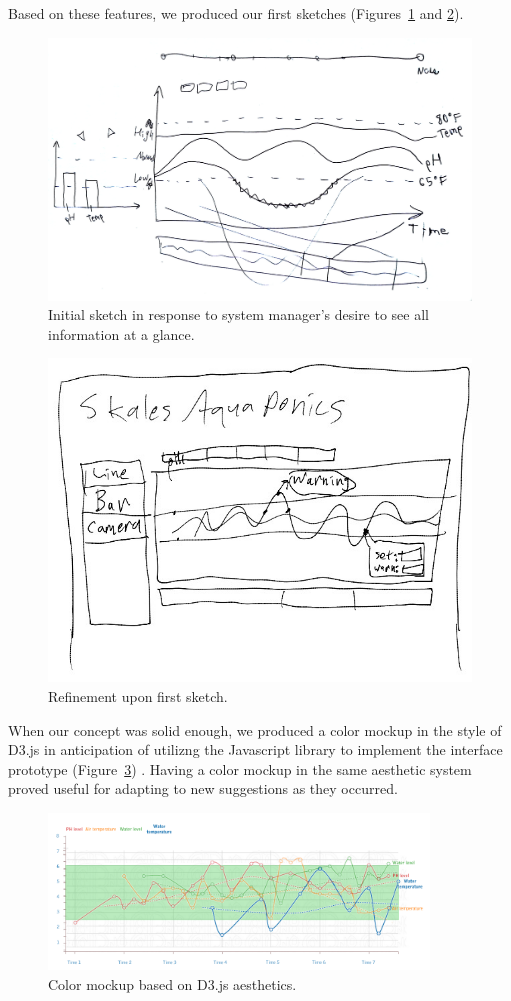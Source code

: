 \documentclass{sigchi}
\begin{document}
Based on these features, we produced our first sketches (Figures~\ref{fig:sketch1} and \ref{fig:sketch2}). 
\begin{figure}[!h]
\centering
\includegraphics[width=0.9\columnwidth]{Sketch1}
\caption{Initial sketch in response to system manager's desire to see all information at a glance.}
\label{fig:sketch1}
\end{figure}
\begin{figure}[!h]
\centering
\includegraphics[width=0.9\columnwidth]{Sketch2}
\caption{Refinement upon first sketch.}
\label{fig:sketch2}
\end{figure}
When our concept was solid enough, we produced a color mockup in the style of D3.js in anticipation of utilizng the Javascript library to implement the interface prototype (Figure~\ref{fig:mockup}) \cite{d3js}. Having a color mockup in the same aesthetic system proved useful for adapting to new suggestions as they occurred.

\begin{figure}
\centering
\includegraphics[width=0.9\textwidth]{Mockup}
\caption{Color mockup based on D3.js aesthetics.}
\label{fig:mockup}
\end{figure}
\end{document}
